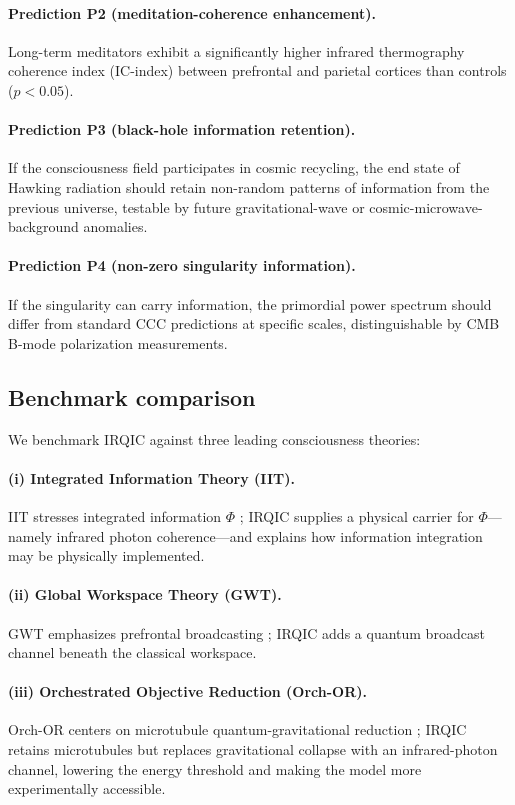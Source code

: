 \documentclass[11pt,a4paper]{article}
\begin{document}
\paragraph{Prediction P2 (meditation-coherence enhancement).} Long-term meditators exhibit a significantly higher infrared thermography coherence index (IC-index) between prefrontal and parietal cortices than controls ($p < 0.05$).

\paragraph{Prediction P3 (black-hole information retention).} If the consciousness field participates in cosmic recycling, the end state of Hawking radiation should retain non-random patterns of information from the previous universe, testable by future gravitational-wave or cosmic-microwave-background anomalies.

\paragraph{Prediction P4 (non-zero singularity information).} If the singularity can carry information, the primordial power spectrum should differ from standard CCC predictions at specific scales, distinguishable by CMB B-mode polarization measurements.

\subsection{Benchmark comparison}

We benchmark IRQIC against three leading consciousness theories:

\paragraph{(i) Integrated Information Theory (IIT).} IIT stresses integrated information $\Phi$ \cite{Tononi2004}; IRQIC supplies a physical carrier for $\Phi$---namely infrared photon coherence---and explains how information integration may be physically implemented.

\paragraph{(ii) Global Workspace Theory (GWT).} GWT emphasizes prefrontal broadcasting \cite{Dehaene2011}; IRQIC adds a quantum broadcast channel beneath the classical workspace.

\paragraph{(iii) Orchestrated Objective Reduction (Orch-OR).} Orch-OR centers on microtubule quantum-gravitational reduction \cite{Hameroff2014}; IRQIC retains microtubules but replaces gravitational collapse with an infrared-photon channel, lowering the energy threshold and making the model more experimentally accessible.
\end{document}
